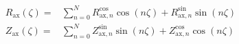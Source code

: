 \documentclass[a4paper, 12pt]{article}
\begin{document}
\begin{align*}
R_\mathrm{ax}(\zeta) =& \sum\limits_{n=0}^{N}   R_{\mathrm{ax}, n}^\mathrm{cos} \cos \left( n \zeta \right)
                                              + R_{\mathrm{ax}, n}^\mathrm{sin} \sin \left( n \zeta \right) \\
Z_\mathrm{ax}(\zeta) =& \sum\limits_{n=0}^{N}   Z_{\mathrm{ax}, n}^\mathrm{sin} \sin \left( n \zeta \right)
                                              + Z_{\mathrm{ax}, n}^\mathrm{cos} \cos \left( n \zeta \right)
\end{align*}
\end{document}
